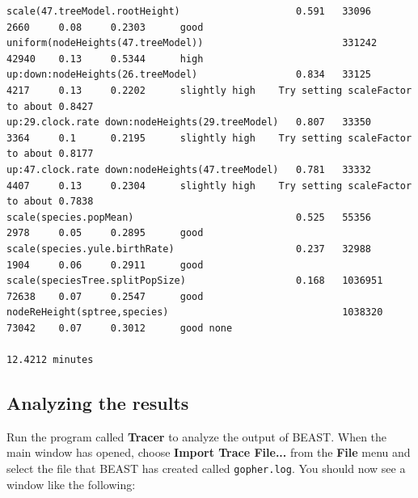 \documentclass[12pt]{article}
\begin{document}
{\begin{verbatim}
scale(47.treeModel.rootHeight)                    0.591   33096      2660     0.08     0.2303      good	
uniform(nodeHeights(47.treeModel))                        331242     42940    0.13     0.5344      high	
up:down:nodeHeights(26.treeModel)                 0.834   33125      4217     0.13     0.2202      slightly high	Try setting scaleFactor to about 0.8427
up:29.clock.rate down:nodeHeights(29.treeModel)   0.807   33350      3364     0.1      0.2195      slightly high	Try setting scaleFactor to about 0.8177
up:47.clock.rate down:nodeHeights(47.treeModel)   0.781   33332      4407     0.13     0.2304      slightly high	Try setting scaleFactor to about 0.7838
scale(species.popMean)                            0.525   55356      2978     0.05     0.2895      good	
scale(species.yule.birthRate)                     0.237   32988      1904     0.06     0.2911      good	
scale(speciesTree.splitPopSize)                   0.168   1036951    72638    0.07     0.2547      good	
nodeReHeight(sptree,species)                              1038320    73042    0.07     0.3012      good	none

12.4212 minutes 
\end{verbatim}}

\subsection*{Analyzing the results}

Run the program called {\bf Tracer} to analyze the output of BEAST. When the main
window has opened, choose {\bf Import Trace File...} from the {\bf File} menu and select the file that
BEAST has created called \texttt{gopher.log}.
You should now see a window like the following:

\medskip{}

\end{document}
